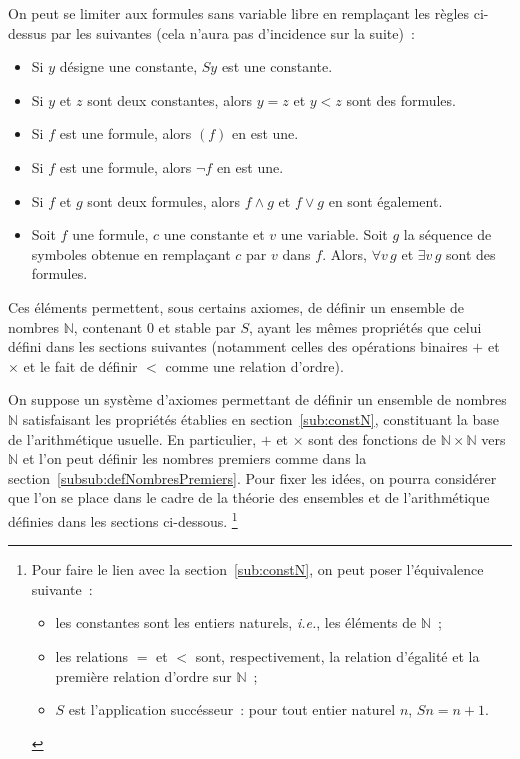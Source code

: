 On peut se limiter aux formules sans variable libre en remplaçant les règles ci-dessus par les suivantes (cela n'aura pas d'incidence sur la suite) :
\begin{itemize}[nosep]
    \item Si $y$ désigne une constante, $S y$ est une constante.
    \item Si $y$ et $z$ sont deux constantes, alors $y = z$ et $y < z$ sont des formules.
    \item Si $f$ est une formule, alors $(f)$ en est une. 
    \item Si $f$ est une formule, alors $\neg f$ en est une. 
    \item Si $f$ et $g$ sont deux formules, alors $f \wedge g$ et $f \vee g$ en sont également. 
    \item Soit $f$ une formule, $c$ une constante et $v$ une variable. 
        Soit $g$ la séquence de symboles obtenue en remplaçant $c$ par $v$ dans $f$.
        Alors, $\forall v \, g$ et $\exists v \, g$ sont des formules.
\end{itemize}
Ces éléments permettent, sous certains axiomes, de définir un ensemble de nombres $\mathbb{N}$, contenant $0$ et stable par $S$, ayant les mêmes propriétés que celui défini dans les sections suivantes (notamment celles des opérations binaires $+$ et $\times$ et le fait de définir $<$ comme une relation d'ordre). 

On suppose un système d'axiomes permettant de définir un ensemble de nombres $\mathbb{N}$ satisfaisant les propriétés établies en section~\ref{sub:constN}, constituant la base de l'arithmétique usuelle.
En particulier, $+$ et $\times$ sont des fonctions de $\mathbb{N} \times \mathbb{N}$ vers $\mathbb{N}$ et l'on peut définir les nombres premiers comme dans la section~\ref{subsub:defNombresPremiers}. 
Pour fixer les idées, on pourra considérer que l'on se place dans le cadre de la théorie des ensembles et de l'arithmétique définies dans les sections ci-dessous.%
\footnote{
    Pour faire le lien avec la section~\ref{sub:constN}, on peut poser l'équivalence suivante :
    \begin{itemize}[nosep]
        \item les constantes sont les entiers naturels, \emph{i.e.}, les éléments de $\mathbb{N}$ ;
        \item les relations $=$ et $<$ sont, respectivement, la relation d'égalité et la première relation d'ordre sur $\mathbb{N}$ ;
        \item $S$ est l'application succésseur : pour tout entier naturel $n$, $S n = n + 1$.
    \end{itemize}
} 

